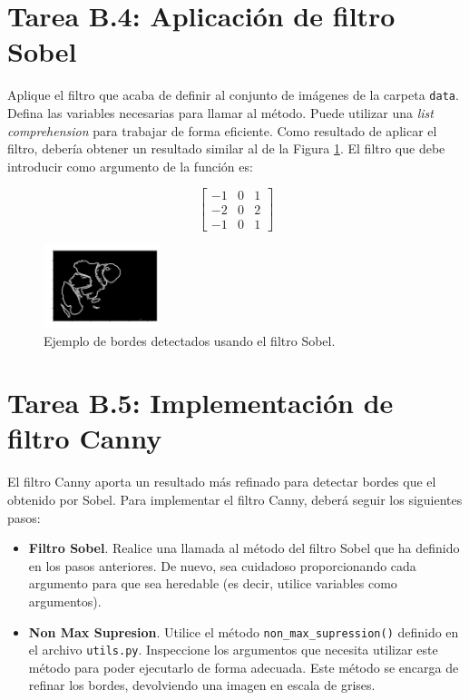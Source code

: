\section*{Tarea B.4: Aplicación de filtro Sobel}
{}

Aplique el filtro que acaba de definir al conjunto de imágenes de la carpeta \texttt{data}. Defina las variables necesarias para llamar al método. Puede utilizar una \textit{list comprehension} para trabajar de forma eficiente. Como resultado de aplicar el filtro, debería obtener un resultado similar al de la Figura \ref{fig:edges}. El filtro que debe introducir como argumento de la función es:

\[
\begin{bmatrix}
-1 & 0 & 1 \\
-2 & 0 & 2 \\
-1 & 0 & 1
\end{bmatrix}
\]


\begin{figure}[H]
    \centering
    \includegraphics[width=0.3\textwidth]{Lab_2/template/figures/edges.png}
    \caption{Ejemplo de bordes detectados usando el filtro Sobel.}
    \label{fig:edges}
\end{figure}

\section*{Tarea B.5: Implementación de filtro Canny}
{}
El filtro Canny aporta un resultado más refinado para detectar bordes que el obtenido por Sobel. Para implementar el filtro Canny, deberá seguir los siguientes pasos:

\begin{itemize}
    \item \textbf{Filtro Sobel}. Realice una llamada al método del filtro Sobel que ha definido en los pasos anteriores. De nuevo,  sea cuidadoso proporcionando cada argumento para que sea heredable (es decir, utilice variables como argumentos).
    \item \textbf{Non Max Supresion}. Utilice el método \texttt{non\_max\_supression()} definido en el archivo \texttt{utils.py}. Inspeccione los argumentos que necesita utilizar este método para poder ejecutarlo de forma adecuada. Este método se encarga de refinar los bordes, devolviendo una imagen en escala de grises. 
\end{itemize}


